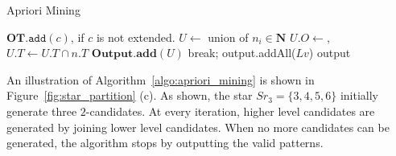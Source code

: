 \begin{algorithm}
\caption{Apriori Mining}
\label{algo:apriori_mining}
\begin{algorithmic}[1]
\EndFor
{}
			\EndFor
			\State $\mathbf{OT}.\mathtt{add}(c)$, if $c$ is not extended.
		\EndFor	
		\State $U \gets $ union of $n_i \in \mathbf{N}$
			\State $U.O \gets$,  $U.T \gets U.T \cap n.T$
		\EndFor
			\State $\mathbf{Output}.\mathbf{add}(U)$
			\State break;
		\EndIf
		 
		\EndIf
\EndWhile
\State output.addAll($Lv$)
\State \Return output
\end{algorithmic}
\end{algorithm}
 
An illustration of Algorithm~\ref{algo:apriori_mining} is shown in Figure~\ref{fig:star_partition} (c).
As shown, the star $Sr_3=\{3,4,5,6\}$ initially generate three $2$-candidates. At every iteration, 
higher level candidates are generated by joining lower level candidates. When no more candidates 
can be generated, the algorithm stops by outputting the valid patterns.
%










